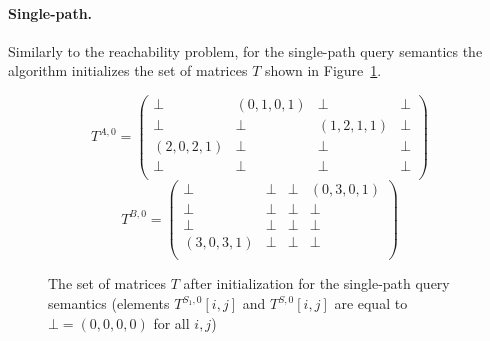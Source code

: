 \paragraph{Single-path.} %
Similarly to the reachability problem, for the single-path query semantics the algorithm initializes the set of matrices $T$ shown in Figure~\ref{ExampleQueryInitMatrixSingle}.

{\footnotesize
\begin{figure}[h]
	\[
	T^{A, 0} = \begin{pmatrix}
	\bot & (0, 1, 0, 1)       & \bot & \bot       \\
	\bot & \bot & (1, 2, 1, 1)       & \bot \\
	(2, 0, 2, 1)       & \bot & \bot & \bot \\
	\bot       & \bot & \bot & \bot \\
	\end{pmatrix}
	\]
	\[
	T^{B, 0} = \begin{pmatrix}
	\bot & \bot       & \bot & (0, 3, 0, 1)       \\
	\bot & \bot & \bot       & \bot \\
	\bot       & \bot & \bot & \bot \\
	(3, 0, 3, 1)      & \bot & \bot & \bot \\
	\end{pmatrix}
	\]
	\caption{The set of matrices $T$ after initialization for the single-path query semantics (elements $T^{S_1, 0}[i, j]$ and $T^{S, 0}[i, j]$ are equal to $\bot = (0, 0, 0, 0)$ for all $i, j$)}
	\label{ExampleQueryInitMatrixSingle}
\end{figure}
}

